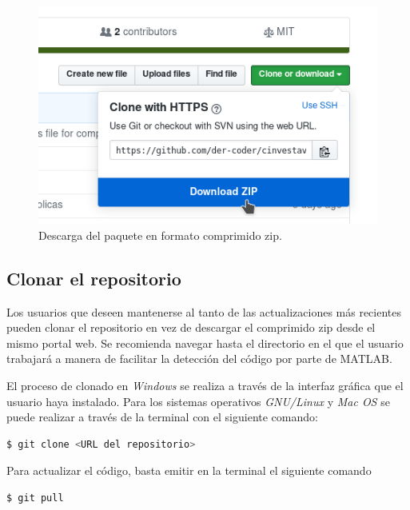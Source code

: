 \begin{figure}[h]
 \centering
 \includegraphics{img/install_github_download_zip.png}
 \caption{Descarga del paquete en formato comprimido zip.}
 \label{fig: descarga zip}
\end{figure}

\subsection{Clonar el repositorio}

Los usuarios que deseen mantenerse al tanto de las actualizaciones más recientes
pueden clonar el repositorio en vez de descargar el comprimido zip desde el mismo 
portal web. Se recomienda navegar hasta el directorio en el que el usuario trabajará
a manera de facilitar la detección del código por parte de MATLAB.

El proceso de clonado en \emph{Windows} se realiza a través de la interfaz gráfica 
que el usuario haya instalado. Para los sistemas operativos \emph{GNU/Linux} y 
\emph{Mac OS} se puede realizar a través de la terminal con el siguiente comando:


\begin{center}
\begin{lstlisting}[language=bash, frame=single]
$ git clone <URL del repositorio> 
\end{lstlisting}
\end{center}

Para actualizar el código, basta emitir en la terminal el siguiente comando

\begin{center}
\begin{lstlisting}[language=bash, frame=single]
$ git pull
\end{lstlisting}
\end{center}

